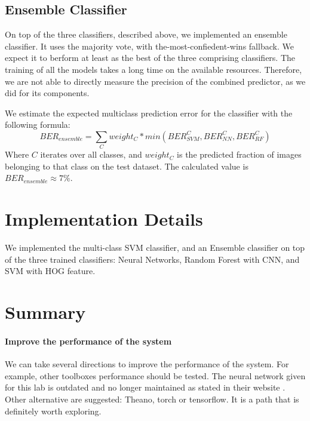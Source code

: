\documentclass{article} %
\begin{document}
\subsection{Ensemble Classifier}

On top of the three classifiers, described above, we implemented an ensemble classifier. It uses the majority vote, with the-most-confiedent-wins fallback. We expect it to berform at least as the best of the three comprising classifiers. The training of all the models takes a long time on the available resources. Therefore, we are not able to directly measure the precision of the combined predictor, as we did for its components.

We estimate the expected multiclass prediction error for the classifier with the following formula:
\[
BER_{ensemble} = \sum_C weight_C*min(BER_{SVM}^C, BER_{NN}^C, BER_{RF}^C)
\]
Where $C$ iterates over all classes, and $weight_C$ is the predicted fraction of images belonging to that class on the test dataset. The calculated value is $BER_{ensemble} \approx 7\%$.

\section{Implementation Details}

We implemented the multi-class SVM classifier, and an Ensemble classifier on top of the three trained classifiers: Neural Networks, Random Forest with CNN, and SVM with HOG feature.







\section{Summary}



\paragraph{Improve the performance of the system}
We can take several directions to improve the performance of the system.
For example, other toolboxes performance should be tested. The neural network given for this lab is outdated and no longer maintained as stated in their website \cite{deeplearningtoolbox}. Other alternative are suggested: Theano, torch or tensorflow. It is a path that is definitely worth exploring.
\end{document}
